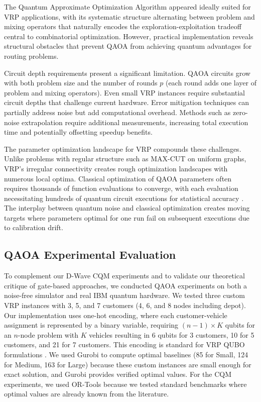 \documentclass[preprint,3p,12pt,authoryear]{elsarticle}
\begin{document}
The Quantum Approximate Optimization Algorithm appeared ideally suited for VRP applications, with its systematic structure alternating between problem and mixing operators that naturally encodes the exploration-exploitation tradeoff central to combinatorial optimization. However, practical implementation reveals structural obstacles that prevent QAOA from achieving quantum advantages for routing problems.

Circuit depth requirements present a significant limitation. QAOA circuits grow with both problem size and the number of rounds $p$ (each round adds one layer of problem and mixing operators). Even small VRP instances require substantial circuit depths that challenge current hardware. Error mitigation techniques can partially address noise but add computational overhead. Methods such as zero-noise extrapolation require additional measurements, increasing total execution time and potentially offsetting speedup benefits.

The parameter optimization landscape for VRP compounds these challenges. Unlike problems with regular structure such as MAX-CUT on uniform graphs, VRP's irregular connectivity creates rough optimization landscapes with numerous local optima. Classical optimization of QAOA parameters often requires thousands of function evaluations to converge, with each evaluation necessitating hundreds of quantum circuit executions for statistical accuracy  \citep{scriva2024challenges, pellow2024effect}. The interplay between quantum noise and classical optimization creates moving targets where parameters optimal for one run fail on subsequent executions due to calibration drift.

\subsection{QAOA Experimental Evaluation}

To complement our D-Wave CQM experiments and to validate our theoretical critique of gate-based approaches, we conducted QAOA experiments on both a noise-free simulator and real IBM quantum hardware. We tested three custom VRP instances with 3, 5, and 7 customers (4, 6, and 8 nodes including depot). Our implementation uses one-hot encoding, where each customer-vehicle assignment is represented by a binary variable, requiring $(n-1) \times K$ qubits for an $n$-node problem with $K$ vehicles resulting in 6 qubits for 3 customers, 10 for 5 customers, and 21 for 7 customers. This encoding is standard for VRP QUBO formulations \citep{okada2019efficient, cattelan2024modeling}. We used Gurobi to compute optimal baselines (85 for Small, 124 for Medium, 163 for Large) because these custom instances are small enough for exact solution, and Gurobi provides verified optimal values. For the CQM experiments, we used OR-Tools because we tested standard benchmarks where optimal values are already known from the literature.
\end{document}
